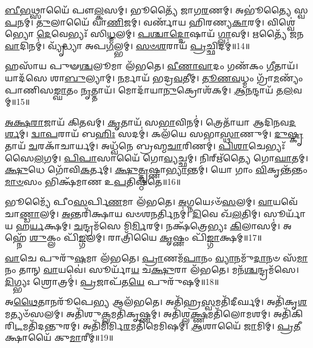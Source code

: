\-\ul{𑌬𑍀}\-\-\ul{𑌭}\-𑌥𑍍𑌸𑌾𑌯𑍈᳴ 𑌪𑍗\-\ul{𑌲𑍍𑌕}\-𑌸𑌮𑍍।
𑌭𑍂𑌤𑍍𑌯𑍈᳴ 𑌜𑌾𑌗\-\ul{𑌰}\-𑌣𑌮𑍍।
𑌅𑌭𑍂॑𑌤𑍍𑌯𑍈 𑌸𑍍𑌵\-\ul{𑌪}\-𑌨𑌮𑍍।
\-\ul{𑌤𑍁}\-𑌲𑌾𑌯𑍈᳴ 𑌵𑌾\-\ul{𑌣𑌿}\-𑌜𑌮𑍍।
𑌵𑌰𑍍𑌣𑌾᳴𑌯 𑌹𑌿𑌰𑌣𑍍𑌯\-\ul{𑌕𑌾}\-𑌰𑌮𑍍।
𑌵𑌿𑌶𑍍𑌵𑍇॑𑌭𑍍𑌯𑍋 \ul{𑌦𑍇}\-𑌵𑍇𑌭𑍍𑌯𑌃᳴ 𑌸𑌿\-\ul{𑌧𑍍𑌮}\-𑌲𑌮𑍍।
\-\ul{𑌪}\-\-\ul{𑌶𑍍𑌚𑌾}\-\-\ul{𑌦𑍍𑌦𑍋}\-𑌷𑌾𑌯᳴ \ul{𑌗𑍍𑌲𑌾}\-𑌵𑌮𑍍।
𑌋𑌤𑍍𑌯𑍈᳴ 𑌜𑌨\-\ul{𑌵𑌾}\-𑌦𑌿𑌨𑌮𑍍॑।
𑌵𑍍𑌯𑍃᳴𑌦𑍍𑌧𑍍𑌯𑌾 𑌅𑌪\-\ul{𑌗}\-𑌲𑍍𑌭𑌮𑍍।
\-\ul{𑌸}\-\-\ul{𑍞}\-\-\ul{𑌶}\-𑌰𑌾𑌯᳴ \ul{𑌪𑍍𑌰}\-𑌚𑍍𑌛𑌿𑌦𑌮𑍍॑॥14॥

𑌹𑌸𑌾᳴𑌯 𑌪𑍁𑍟\-\ul{𑌶𑍍𑌚}\-𑌲𑍂𑌮𑌾 𑌲᳴𑌭𑌤𑍇।
\-\ul{𑌵𑍀}\-\-\ul{𑌣𑌾}\-\-\ul{𑌵𑌾}\-𑌦𑌂 𑌗𑌣᳴𑌕𑌂 \ul{𑌗𑍀}\-𑌤𑌾𑌯᳴।
𑌯𑌾𑌦᳴𑌸𑍇 𑌶𑌾\-\ul{𑌬𑍁}\-𑌲𑍍𑌯𑌾𑌮𑍍।
\-\ul{𑌨}\-𑌰𑍍𑌮𑌾𑌯᳴ 𑌭𑌦𑍍𑌰\-\ul{𑌵}\-𑌤𑍀𑌮𑍍।
\-\ul{𑌤𑍂}\-\-\ul{𑌣}\-\-\ul{𑌵}\-𑌧𑍍𑌮𑌂 𑌗𑍍𑌰𑌾᳴\-\ul{𑌮}\-𑌣𑍍𑌯𑌂᳴ 𑌪𑌾𑌣𑌿𑌸\-\ul{𑌙𑍍𑌘𑌾}\-𑌤𑌂 \ul{𑌨𑍃}\-𑌤𑍍𑌤𑌾𑌯᳴।
𑌮𑍋𑌦𑌾᳴𑌯𑌾\-\ul{𑌨𑍁}\-𑌕𑍍𑌰𑍋𑌶᳴𑌕𑌮𑍍।
\-\ul{𑌆}\-\-\ul{𑌨}\-𑌨𑍍𑌦𑌾𑌯᳴ 𑌤\-\ul{𑌲}\-𑌵𑌮𑍍॥15॥

\-\ul{𑌅}\-\-\ul{𑌕𑍍𑌷}\-\-\ul{𑌰𑌾}\-𑌜𑌾𑌯᳴ 𑌕𑌿\-\ul{𑌤}\-𑌵𑌮𑍍।
\-\ul{𑌕𑍃}\-𑌤𑌾𑌯᳴ 𑌸\-\ul{𑌭𑌾}\-𑌵𑌿𑌨𑌮𑍍॑।
𑌤𑍍𑌰𑍇𑌤𑌾᳴𑌯𑌾 𑌆𑌦𑌿𑌨𑌵\-\ul{𑌦}\-\-\ul{𑌰𑍍}\-𑌶𑌮𑍍।
\-\ul{𑌦𑍍𑌵𑌾}\-\-\ul{𑌪}\-𑌰𑌾𑌯᳴ 𑌬\-\ul{𑌹𑌿𑌃} 𑌸𑌦𑌮𑍍॑।
𑌕𑌲᳴𑌯𑍇 𑌸𑌭𑌾\-\ul{𑌸𑍍𑌥𑌾}\-𑌣𑍁𑌮𑍍।
\-\ul{𑌦𑍁}\-\-\ul{𑌷𑍍𑌕𑍃}\-𑌤𑌾𑌯᳴ \ul{𑌚}\-𑌰𑌕𑌾᳴𑌚𑌾𑌰𑍍𑌯𑌮𑍍।
𑌅𑌧𑍍𑌵᳴𑌨𑍇 𑌬𑍍𑌰𑌹𑍍𑌮\-\ul{𑌚𑌾}\-𑌰𑌿𑌣𑌮𑍍॑।
\-\ul{𑌪𑌿}\-\-\ul{𑌶𑌾}\-𑌚𑍇𑌭𑍍𑌯𑌃᳴ 𑌸𑍈\-\ul{𑌲}\-𑌗𑌮𑍍।
\-\ul{𑌪𑌿}\-\-\ul{𑌪𑌾}\-𑌸𑌾𑌯𑍈᳴ 𑌗𑍋\-\ul{𑌵𑍍𑌯}\-𑌚𑍍𑌛𑌮𑍍।
𑌨𑌿𑌰𑍍\mbox{}𑌋᳴𑌤𑍍𑌯𑍈 𑌗𑍋\-\ul{𑌘𑌾}\-𑌤𑌮𑍍।
\-\ul{𑌕𑍍𑌷𑍁}\-𑌧𑍇 𑌗𑍋᳴𑌵𑌿\-\ul{𑌕}\-𑌰𑍍𑌤𑌮𑍍।
\-\ul{𑌕𑍍𑌷𑍁}\-\-\ul{𑌤𑍍𑌤𑍃}\-𑌷𑍍𑌣𑌾\-\ul{𑌭𑍍𑌯𑌾}\-𑌨𑍍𑌤𑌮𑍍।
𑌯𑍋 𑌗𑌾𑌂 \ul{𑌵𑌿}\-𑌕𑍃𑌨𑍍𑌤᳴𑌨𑍍𑌤𑌂 \ul{𑌮𑌾}\-\-\ul{𑍞}\-𑌸𑌂 𑌭𑌿𑌕𑍍𑌷᳴𑌮𑌾𑌣 𑌉\-\ul{𑌪}\-𑌤𑌿𑌷𑍍𑌠᳴𑌤𑍇॥16॥

𑌭𑍂𑌮𑍍𑌯𑍈᳴ 𑌪𑍀𑌠\-\ul{𑌸}\-𑌰𑍍𑌪𑌿\-\ul{𑌣}\-𑌮𑌾 𑌲᳴𑌭𑌤𑍇।
\-\ul{𑌅}\-𑌗𑍍𑌨𑌯𑍇\-𑌽𑍞᳴\-\ul{𑌸}\-𑌲𑌮𑍍।
\-\ul{𑌵𑌾}\-𑌯𑌵𑍇᳴ 𑌚𑌾\-\ul{𑌣𑍍𑌡𑌾}\-𑌲𑌮𑍍।
\-\ul{𑌅}\-𑌨𑍍𑌤𑌰𑌿᳴𑌕𑍍𑌷𑌾𑌯 𑌵𑍞𑌶\-\ul{𑌨}\-𑌰𑍍𑌤𑌿𑌨𑌮𑍍॑।
\-\ul{𑌦𑌿}\-𑌵𑍇 𑌖᳴\-\ul{𑌲}\-𑌤𑌿𑌮𑍍।
𑌸𑍂𑌰𑍍𑌯𑌾᳴𑌯 𑌹\-\ul{𑌰𑍍𑌯}\-𑌕𑍍𑌷𑌮𑍍।
\-\ul{𑌚}\-𑌨𑍍𑌦𑍍𑌰𑌮᳴𑌸𑍇 𑌮𑌿\-\ul{𑌰𑍍𑌮𑌿}\-𑌰𑌮𑍍।
𑌨𑌕𑍍𑌷᳴𑌤𑍍𑌰𑍇𑌭𑍍𑌯𑌃 \ul{𑌕𑌿}\-𑌲𑌾𑌸𑌮𑍍॑।
𑌅𑌹𑍍𑌨𑍇᳴ \ul{𑌶𑍁}\-𑌕𑍍𑌲𑌂 𑌪𑌿᳴\-\ul{𑌙𑍍𑌗}\-𑌲𑌮𑍍।
𑌰𑌾𑌤𑍍𑌰𑌿᳴𑌯𑍈 \ul{𑌕𑍃}\-𑌷𑍍𑌣𑌂 𑌪𑌿᳴\-\ul{𑌙𑍍𑌗𑌾}\-𑌕𑍍𑌷𑌮𑍍॥17॥

\-\ul{𑌵𑌾}\-𑌚𑍇 𑌪𑍁𑌰𑍁᳴\-\ul{𑌷}\-𑌮𑌾 𑌲᳴𑌭𑌤𑍇।
\-\ul{𑌪𑍍𑌰𑌾}\-𑌣𑌮᳴\-\ul{𑌪𑌾}\-𑌨𑌂 \ul{𑌵𑍍𑌯𑌾}\-𑌨𑌮𑍁᳴\-\ul{𑌦𑌾}\-𑌨𑍞 𑌸᳴\-\ul{𑌮𑌾}\-𑌨𑌂 𑌤𑌾𑌨𑍍 \ul{𑌵𑌾}\-𑌯𑌵𑍇॑।
𑌸𑍂𑌰𑍍𑌯𑌾᳴\-\ul{𑌯} 𑌚\-\ul{𑌕𑍍𑌷𑍁}\-𑌰𑌾 𑌲᳴𑌭𑌤𑍇।
𑌮𑌨᳴\-\ul{𑌶𑍍𑌚}\-𑌨𑍍𑌦𑍍𑌰𑌮᳴𑌸𑍇।
\-\ul{𑌦𑌿}\-𑌗𑍍𑌭𑍍𑌯𑌃 𑌶𑍍𑌰𑍋𑌤𑍍𑌰𑌮𑍍॑।
\-\ul{𑌪𑍍𑌰}\-𑌜𑌾𑌪᳴𑌤\-\ul{𑌯𑍇} 𑌪𑍁𑌰𑍁᳴𑌷𑌮𑍍॥18॥

𑌅\-\ul{𑌥𑍈}\-𑌤𑌾𑌨𑌰𑍂᳴𑌪𑍇\-\ul{𑌭𑍍𑌯} 𑌆𑌲᳴𑌭𑌤𑍇।
𑌅𑌤𑌿᳴𑌹𑍍𑌰\-\ul{𑌸𑍍𑌵}\-𑌮𑌤𑌿᳴𑌦𑍀𑌰𑍍𑌘𑌮𑍍।
𑌅𑌤𑌿᳴𑌕𑍃\-\ul{𑌶}\-𑌮𑌤𑍍𑌯𑍞᳴𑌸𑌲𑌮𑍍।
𑌅𑌤𑌿᳴𑌶𑍁\-\ul{𑌕𑍍𑌲}\-𑌮𑌤𑌿᳴𑌕𑍃𑌷𑍍𑌣𑌮𑍍।
𑌅𑌤𑌿᳴𑌶𑍍𑌲\-\ul{𑌕𑍍𑌷𑍍𑌣}\-\-𑌮𑌤𑌿᳴𑌲𑍋𑌮𑌶𑌮𑍍।
𑌅𑌤𑌿᳴𑌕𑌿𑌰𑌿\-\ul{𑌟}\-𑌮𑌤𑌿᳴𑌦𑌨𑍍𑌤𑍁𑌰𑌮𑍍।
𑌅𑌤𑌿᳴𑌮𑌿𑌰𑍍𑌮𑌿\-\ul{𑌰}\-𑌮𑌤𑌿᳴\-𑌮𑍇𑌮𑌿𑌷𑌮𑍍।
\-\ul{𑌆}\-𑌶𑌾𑌯𑍈᳴ \ul{𑌜𑌾}\-𑌮𑌿𑌮𑍍।
\-\ul{𑌪𑍍𑌰}\-\-\ul{𑌤𑍀}\-𑌕𑍍𑌷𑌾𑌯𑍈᳴ 𑌕𑍁\-\ul{𑌮𑌾}\-𑌰𑍀𑌮𑍍॥19॥%




